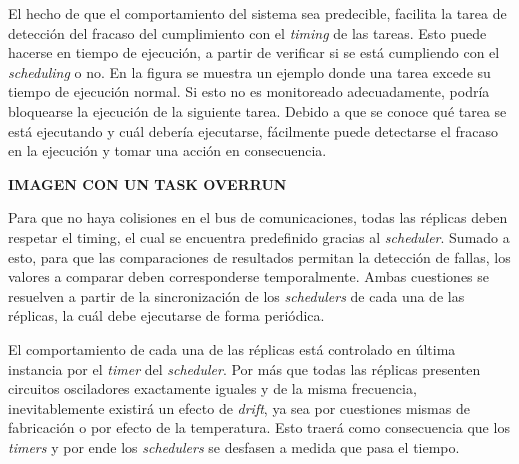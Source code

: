 
El hecho de que el comportamiento del sistema sea predecible, facilita la tarea de detección del fracaso del cumplimiento con el \textit{timing} de las tareas. Esto puede hacerse en tiempo de ejecución, a partir de verificar si se está cumpliendo con el \textit{scheduling} o no. En la figura  se muestra un ejemplo donde una tarea excede su tiempo de ejecución normal. Si esto no es monitoreado adecuadamente, podría bloquearse la ejecución de la siguiente tarea. Debido a que se conoce qué tarea se está ejecutando y cuál debería ejecutarse, fácilmente puede detectarse el fracaso en la ejecución y tomar una acción en consecuencia.

{\Large \textbf{{\color{red} IMAGEN CON UN TASK OVERRUN}}}



Para que no haya colisiones en el bus de comunicaciones, todas las réplicas deben respetar el timing, el cual se encuentra predefinido gracias al \textit{scheduler}. Sumado a esto, para que las comparaciones de resultados permitan la detección de fallas, los valores a comparar deben corresponderse temporalmente. Ambas cuestiones se resuelven a partir de la sincronización de los \textit{schedulers} de cada una de las réplicas, la cuál debe ejecutarse de forma periódica.

El comportamiento de cada una de las réplicas está controlado en última instancia por el \textit{timer} del \textit{scheduler}. Por más que todas las réplicas presenten circuitos osciladores exactamente iguales y de la misma frecuencia, inevitablemente existirá un efecto de \textit{drift}, ya sea por cuestiones mismas de fabricación o por efecto de la temperatura. Esto traerá como consecuencia que los \textit{timers} y por ende los \textit{schedulers} se desfasen a medida que pasa el tiempo. 

